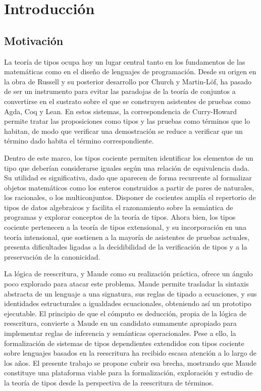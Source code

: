 \chapter{Introducci\'on}\label{ch:intro}
\section{Motivación}
La teoría de tipos ocupa hoy un lugar central tanto en los fundamentos de las matemáticas como en el diseño de lenguajes de programación. Desde su origen en la obra de Russell y su posterior desarrollo por Church y Martin-Löf, ha pasado de ser un instrumento para evitar las paradojas de la teoría de conjuntos a convertirse en el sustrato sobre el que se construyen asistentes de pruebas como Agda, Coq y Lean. En estos sistemas, la correspondencia de Curry-Howard permite tratar las proposiciones como tipos y las pruebas como términos que lo habitan, de modo que verificar una demostración se reduce a verificar que un término dado habita el término correspondiente.

Dentro de este marco, los tipos cociente permiten identificar los elementos de un tipo que deberían considerarse iguales según una relación de equivalencia dada. Su utilidad es significativa, dado que aparecen de forma recurrente al formalizar objetos matemáticos como los enteros construidos a partir de pares de naturales, los racionales, o los multiconjuntos. Disponer de cocientes amplía el repertorio de tipos de datos algebraicos y facilita el razonamiento sobre la semántica de programas y explorar conceptos de la teoría de tipos. Ahora bien, los tipos cociente pertenecen a la teoría de tipos extensional, y su incorporación en una teoría intensional, que sostienen a la mayoría de asistentes de pruebas actuales, presenta dificultades ligadas a la decidibilidad de la verificación de tipos y a la preservación de la canonicidad.

La lógica de reescritura, y Maude como su realización práctica, ofrece un ángulo poco explorado para atacar este problema. Maude permite trasladar la sintaxis abstracta de un lenguaje a una signatura, sus reglas de tipado a ecuaciones, y sus identidades estructurales a igualdades ecuacionales, obteniendo así un prototipo ejecutable. El principio de que el cómputo es deducción, propia de la lógica de reescritura, convierte a Maude en un candidato sumamente apropiado para implementar reglas de inferencia y semánticas operacionales. Pese a ello, la formalización de sistemas de tipos dependientes extendidos con tipos cociente sobre lenguajes basados en la reescritura ha recibido escasa atención a lo largo de los años. El presente trabajo se propone cubrir esa brecha, mostrando que Maude constituye una plataforma viable para la formalización, exploración y estudio de la teoría de tipos desde la perspectiva de la reescritura de términos.
